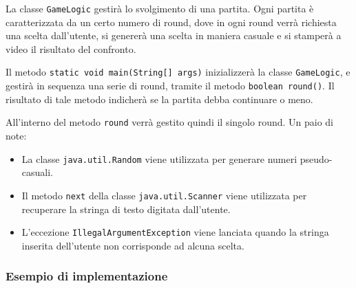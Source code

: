 \documentclass{article}
\begin{document}
La classe \texttt{GameLogic} gestirà lo svolgimento di una partita.
Ogni partita è caratterizzata da un certo numero di round, 
dove in ogni round verrà richiesta una scelta dall'utente, si genererà una scelta in maniera casuale
e si stamperà a video il risultato del confronto.

Il metodo \texttt{static void main(String[] args)} inizializzerà la classe \texttt{GameLogic},
e gestirà in sequenza una serie di round, tramite il metodo \texttt{boolean round()}.
Il risultato di tale metodo indicherà se la partita debba continuare o meno.

All'interno del metodo \texttt{round} verrà gestito quindi il singolo round.
Un paio di note:
\begin{itemize}
	\item La classe \texttt{java.util.Random} viene utilizzata per generare numeri pseudo-casuali.
	\item Il metodo \texttt{next} della classe \texttt{java.util.Scanner} viene utilizzata per recuperare la stringa di testo digitata
	dall'utente.
	\item L'eccezione \texttt{IllegalArgumentException} viene lanciata quando la stringa inserita dell'utente non corrisponde ad alcuna
	scelta.
\end{itemize}

\subsubsection{Esempio di implementazione}
\end{document}
